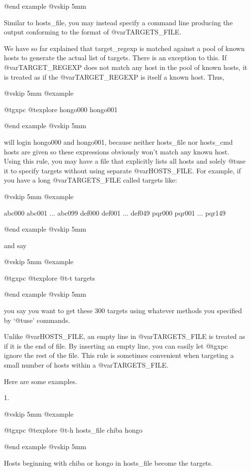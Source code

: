 @end example
@vskip 5mm

Similar to hosts_file, you may instead specify a command line
producing the output conforming to the format of @var{TARGETS_FILE}.

We have so far explained that target_regexp is matched against a
pool of known hosts to generate the actual list of targets.
There is an exception to this. If @var{TARGET_REGEXP} does not match
any host in the pool of known hosts, it is treated as if the
@var{TARGET_REGEXP} is itself a known host. Thus,

@vskip 5mm
@example

  @t{gxpc} @t{explore} hongo000 hongo001

@end example
@vskip 5mm

will login hongo000 and hongo001, because neither hosts_file nor
hosts_cmd hosts are given so these expressions obviously won't
match any known host. Using this rule, you may have a file that
explicitly lists all hosts and solely @t{use} it to specify targets
without using separate @var{HOSTS_FILE}. For example, if you have a
long @var{TARGETS_FILE} called targets like:

@vskip 5mm
@example

  abc000
  abc001
    ...
  abc099
  def000
  def001
    ...
  def049
  pqr000
  pqr001
    ...
  pqr149

@end example
@vskip 5mm

and say

@vskip 5mm
@example

  @t{gxpc} @t{explore} @t{-t} targets

@end example
@vskip 5mm

you say you want to get these 300 targets using whatever methods
you specified by `@t{use}' commands.

Unlike @var{HOSTS_FILE}, an empty line in @var{TARGETS_FILE} is treated as if
it is the end of file. By inserting an empty line, you can easily
let @t{gxpc} ignore the rest of the file. This rule is sometimes
convenient when targeting a small number of hosts within a
@var{TARGETS_FILE}.

Here are some examples.

1.

@vskip 5mm
@example

  @t{gxpc} @t{explore} @t{-h} hosts_file chiba hongo

@end example
@vskip 5mm

Hosts beginning with chiba or hongo in hosts_file 
become the targets.

